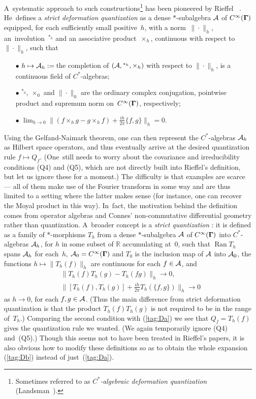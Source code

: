 \documentclass[11pt]{amsart}
\numberwithin{equation}{section}
\theoremstyle{remark}
\newcommand\AAA{{\Cal A}}
\newcommand\Omg{{\bigam}}   %
\newcommand\RR{\mathbb R}
\newcommand{\bigam}{\mbox{\boldmath $\Gamma$}}
\begin{document}
A~systematic approach to such constructions\footnote{Sometimes referred to as
{\sl $C^*$-algebraic deformation quantization\/}
(Landsman~\cite{bib:+tgtgrp}).} has been pioneered by Rieffel \cite{bib:RiefA}
\cite{bib:RiefB}~\cite{bib:RiefM}. He~defines a {\sl strict deformation
quantization\/} as a dense $*$-subalgebra $\AAA$ of $C^\infty(\Omg)$ equipped,
for each sufficiently small positive~$h$, with a norm~$\|\cdot\|_h$,
an~involution~${}^{*_h}$ and an associative product~$\times_h$, continuous
with respect to~$\|\cdot\|_h$, such that
\begin{enumerate}
\item[$\bullet$] $h\mapsto\AAA_h:=\,$the completion of $(\AAA,{}^{*_h},
\times_h)$ with respect to $\|\cdot\|_h$, is a continuous field of
$C^*$-algebras;
\item[$\bullet$] ${}^{*_0},\ \times_0$ and $\|\cdot\|_0$ are the ordinary
complex conjugation, pointwise product and supremum norm on~$C^\infty(\Omg)$,
respectively;
\item[$\bullet$] $\lim_{h\to0} \|(f\times_h g-g\times_h f) + \tfrac{ih}{2\pi}
\{f,g\}\|_h =0$.
\end{enumerate}
Using the Gelfand-Naimark theorem, one can then represent the $C^*$-algebras
$\AAA_h$ as Hilbert space operators, and thus eventually arrive at the
desired quantization rule $f\mapsto Q_f$. (One~still needs to worry about the
covariance and irreducibility conditions (Q4) and (Q5), which are not directly
built into Rieffel's definition, but let us ignore these for a moment.) The
difficulty is that examples are scarce --- all of them make use of the Fourier
transform in some way and are thus limited to a setting where the latter makes
sense (for instance, one can recover the Moyal product in this way). In~fact,
the motivation behind the definition comes from operator algebras and Connes'
non-commutative differential geometry rather than quantization. A~broader
concept is a {\sl strict quantization\/} \cite{bib:Rief}: it is defined as a
family of $*$-morphisms $T_h$ from a dense $*$-subalgebra $\AAA$ of
$C^\infty(\Omg)$ into $C^*$-algebras $\AAA_h$, for $h$ in some subset of $\RR$
accumulating at~0, such that $\operatorname{Ran} T_h$ spans $\AAA_h$ for
each~$h$, $\AAA_0=C^\infty(\Omg)$ and $T_0$ is the inclusion map of $\AAA$ into
$\AAA_0$, the functions $h\mapsto\|T_h(f)\|_h$ are continuous for each
$f\in\AAA$, and
\begin{equation}  \begin{aligned}
& \|T_h(f) T_h(g) - T_h(fg)\|_h \to 0  , \\
& \|[T_h(f),T_h(g)] + \frac{ih}{2\pi} T_h(\{f,g\})\|_h \to 0 \end{aligned}
\label{tag:Rj}  \end{equation}
as $h\to0$, for each $f,g\in\AAA$. (Thus the main difference from strict
deformation quantization is that the product $T_h(f)T_h(g)$ is not required to
be in the range of~$T_h$.) Comparing the second condition with (\ref{tag:Da})
we see that $Q_f=T_h(f)$ gives the quantization rule we wanted. (We again
temporarily ignore (Q4) and~(Q5).) Though this seems not to have been treated
in Rieffel's papers, it is also obvious how to modify these definitions so as
to obtain the whole expansion (\ref{tag:Db}) instead of just~(\ref{tag:Da}).
\end{document}
